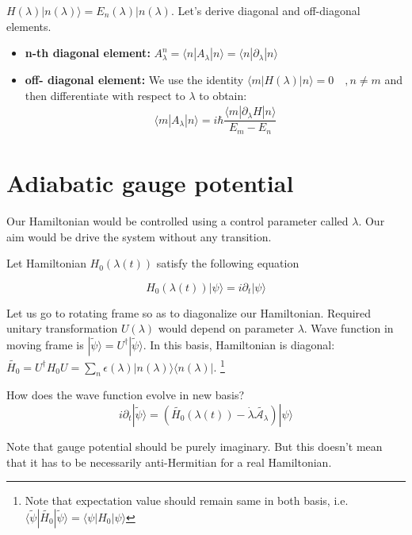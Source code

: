 \documentclass[11pt,a4paper]{article}
\begin{document}
$H (\lambda) |n(\lambda) \rangle = E_n (\lambda) |n(\lambda) $. Let's derive diagonal and off-diagonal elements. 

\begin{itemize}
\item \textbf{n-th diagonal element:} $A_{\lambda}^n= \langle n |A_{\lambda} | n \rangle= \langle n |\partial_{\lambda} | n \rangle $
\item \textbf{off- diagonal element:} We use the identity $\langle m |H(\lambda) | n \rangle=0 \quad, n \neq m$ and then differentiate with respect to $\lambda$ to obtain:
\begin{align}
\langle m |A_{\lambda} | n \rangle = i \hbar \dfrac{\langle m |\partial_{\lambda}H | n \rangle}{E_m-E_n}
\end{align}

\end{itemize}


\section{Adiabatic gauge potential}
Our Hamiltonian would be controlled using a control parameter called $\lambda$. Our aim would be drive the system without any transition.

Let Hamiltonian $H_0(\lambda (t))$ satisfy the following equation

\begin{equation}
H_0(\lambda (t)) |\psi \rangle= i \partial_t|\psi \rangle
\end{equation}

Let us go to rotating frame so as to diagonalize our Hamiltonian. Required unitary transformation $U(\lambda)$ would depend on parameter $\lambda$. Wave function in moving frame is $|\tilde{\psi}  \rangle = U^{\dagger} |\tilde{\psi}  \rangle$. In this basis, Hamiltonian is diagonal:
$\tilde{H_0}= U^{\dagger} H_0 U = \sum_n \epsilon (\lambda)  |n (\lambda)\rangle \langle  n (\lambda) |$. \footnote{Note that expectation value should remain same in both basis, i.e.$ \langle \tilde{\psi} | \tilde{H_0}  |\tilde{\psi}  \rangle= \langle{\psi} | {H_0}  |{\psi}  \rangle$}

How does the wave function evolve in new basis?
\begin{equation}
 i \partial_t|\tilde{\psi} \rangle=(\tilde{H_0
 }(\lambda (t)) - \dot{\lambda} \tilde{\mathcal{A_\lambda}}) |\psi \rangle
\end{equation}

Note that gauge potential should be purely imaginary. But this doesn't mean that it has to be necessarily anti-Hermitian for a real Hamiltonian.
\end{document}
